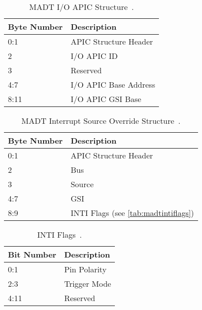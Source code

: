 \begin{table}[H]
  \centering
  \begin{tabularx}{1.0\textwidth}{| X | X |}
    \hline
    \textbf{Byte Number} & \textbf{Description}  \\ \hline\hline
    0:1                  & APIC Structure Header \\ \hline
    2                    & I/O APIC ID           \\ \hline
    3                    & Reserved              \\ \hline
    4:7                  & I/O APIC Base Address \\ \hline
    8:11                 & I/O APIC GSI Base     \\ \hline
  \end{tabularx}
  \caption{MADT I/O APIC Structure~\autocite[sec.~5.2.8.2]{acpi1}.}
  \label{tab:madtioapic}
\end{table}

\begin{table}[H]
  \centering
  \begin{tabularx}{1.0\textwidth}{| X | X |}
    \hline
    \textbf{Byte Number} & \textbf{Description}                                    \\ \hline\hline
    0:1                  & APIC Structure Header                                   \\ \hline
    2                    & Bus                                                     \\ \hline
    3                    & Source                                                  \\ \hline
    4:7                  & GSI                                                     \\ \hline
    8:9                  & INTI Flags (see \autoref{tab:madtintiflags}) \\ \hline
  \end{tabularx}
  \caption{MADT Interrupt Source Override Structure~\autocite[sec.~5.2.8.3.1]{acpi1}.}
  \label{tab:madtirqoverride}
\end{table}

\begin{table}[H]
  \centering
  \begin{tabularx}{1.0\textwidth}{| X | X |}
    \hline
    \textbf{Bit Number} & \textbf{Description} \\ \hline\hline
    0:1                 & Pin Polarity         \\ \hline
    2:3                 & Trigger Mode         \\ \hline
    4:11                & Reserved             \\ \hline
  \end{tabularx}
  \caption{INTI Flags~\autocite[sec.~5.2.8.3.1]{acpi1}.}
  \label{tab:madtintiflags}
\end{table}

